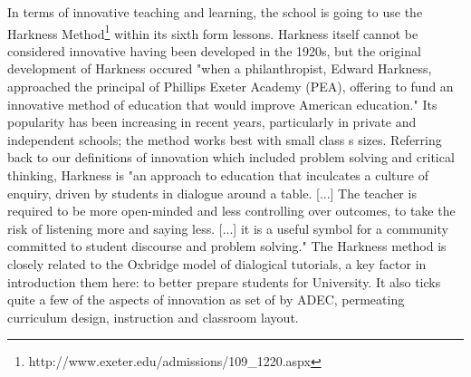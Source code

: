 In terms of innovative teaching and learning, the school is going to use the Harkness Method\footnote{http://www.exeter.edu/admissions/109_1220.aspx} within its sixth form lessons. Harkness itself cannot be considered innovative having been developed in the 1920s, but the original development of Harkness occured "when a philanthropist, Edward Harkness, approached the principal of Phillips Exeter Academy (PEA), offering to fund an innovative method of education that would improve American education." \cite{Sevigny2016} Its popularity has been increasing in recent years, particularly in private and independent schools; the method works best with small class s sizes. Referring back to our definitions of innovation which included problem solving and critical thinking, Harkness is "an approach to education that inculcates a culture of enquiry, driven by students in dialogue around a table. [...] The teacher is required to be more open-minded and less controlling over outcomes, to take the risk of listening more and saying less. [...] it is a useful symbol for a community committed to student discourse and problem solving." \cite{Williams2010} The Harkness method is closely related to the Oxbridge model of dialogical tutorials, a key factor in introduction them here: to better prepare students for University. It also ticks quite a few of the aspects of innovation as set of by ADEC, permeating curriculum design, instruction and classroom layout. 

